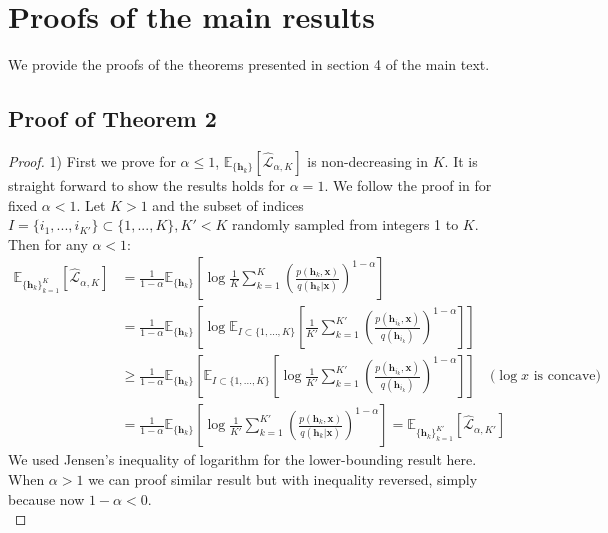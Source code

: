 \section{Proofs of the main results}
\label{sec:proof}

We provide the proofs of the theorems presented in section 4 of the main text.

\subsection{Proof of Theorem 2}
\begin{proof}
 1) First we prove for $\alpha \leq 1$, $\mathbb{E}_{\{ \bm{h}_k \} }[\hat{\mathcal{L}}_{\alpha, K}]$ is non-decreasing in $K$. It is straight forward to show the results holds for $\alpha=1$. We follow the proof in \cite{burda:iwae} for fixed $\alpha < 1$. Let $K > 1$ and the subset of indices $I = \{i_1, ..., i_{K'} \} \subset \{1, ..., K\}, K' < K$ randomly sampled from integers 1 to $K$. Then for any $\alpha < 1$:
 \begin{equation*}
 \begin{aligned}
  \mathbb{E}_{\{ \bm{h}_k \}_{k=1}^K }[\hat{\mathcal{L}}_{\alpha, K}] 
  &= \frac{1}{1 - \alpha} \mathbb{E}_{\{ \bm{h}_k \}} \left[ \log \frac{1}{K} \sum_{k=1}^K \left( \frac{p(\bm{h}_k, \bm{x})}{q(\bm{h}_k|\bm{x})}  \right)^{1 - \alpha} \right] \\
  &= \frac{1}{1 - \alpha} \mathbb{E}_{\{ \bm{h}_k \}} \left[ \log \mathbb{E}_{I \subset \{1, ..., K\}} \left[ \frac{1}{K'} \sum_{k=1}^{K'} \left( \frac{p(\bm{h}_{i_k}, \bm{x})}{q(\bm{h}_{i_k})}  \right)^{1 - \alpha} \right] \right] \\
  &\geq \frac{1}{1 - \alpha} \mathbb{E}_{\{ \bm{h}_k \}} \left[ \mathbb{E}_{I \subset \{1, ..., K\}} \left[ \log \frac{1}{K'} \sum_{k=1}^{K'} \left( \frac{p(\bm{h}_{i_k}, \bm{x})}{q(\bm{h}_{i_k})}  \right)^{1 - \alpha} \right] \right] \quad \text{($\log x$ is concave)}\\
  &= \frac{1}{1 - \alpha} \mathbb{E}_{\{ \bm{h}_k \}} \left[ \log \frac{1}{K'} \sum_{k=1}^{K'} \left( \frac{p(\bm{h}_k, \bm{x})}{q(\bm{h}_k|\bm{x})}  \right)^{1 - \alpha} \right] 
  = \mathbb{E}_{\{ \bm{h}_k \}_{k=1}^{K'} }[\hat{\mathcal{L}}_{\alpha, K'}] 
 \end{aligned}
 \end{equation*}
We used Jensen's inequality of logarithm for the lower-bounding result here. When $\alpha > 1$ we can proof similar result but with inequality reversed, simply because now $1 - \alpha < 0$. \\


\end{proof}

